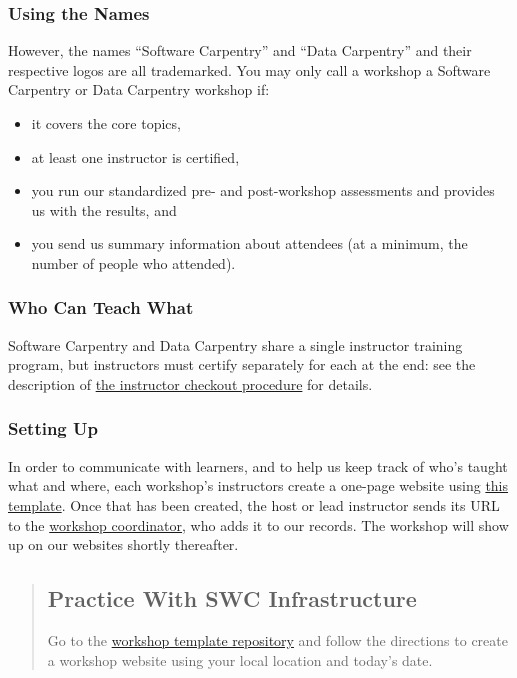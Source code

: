 \subsubsection*{Using the Names}

However, the names ``Software Carpentry'' and ``Data Carpentry''
and their respective logos
are all trademarked.
You may only call a workshop a Software Carpentry or Data Carpentry workshop if:

\begin{itemize}
\item it covers the core topics,
\item at least one instructor is certified,
\item you run our standardized pre- and post-workshop assessments and provides us with the results, and
\item you send us summary information about attendees (at a minimum, the number of people who attended).
\end{itemize}

\subsubsection*{Who Can Teach What}

Software Carpentry and Data Carpentry share a single instructor training program,
but instructors must certify separately for each at the end:
see the description of \href{\{\{ page.root \}\}/checkout/}{the instructor checkout procedure}
for details.

\subsubsection*{Setting Up}

In order to communicate with learners,
and to help us keep track of who's taught what and where,
each workshop's instructors create a one-page website using
\href{\{\{ site.workshop\_template \}\}}{this template}.
Once that has been created,
the host or lead instructor sends its URL to
the \href{mailto:\{\{ site.email \}\}}{workshop coordinator},
who adds it to our records.
The workshop will show up on our websites shortly thereafter.

\begin{quotation}   %
\subsection*{Practice With SWC Infrastructure}

Go to the \href{\{\{ site.workshop\_template \}\}}{workshop template repository} and follow the directions
to create a workshop website using your local location and today's date.
\end{quotation}   %

